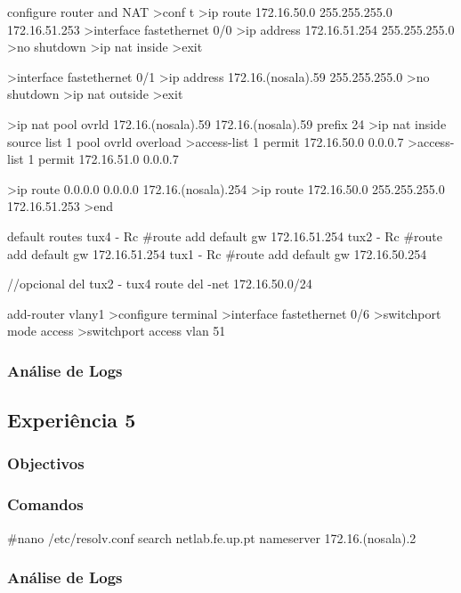 \documentclass[a4paper,11pt]{article}
\begin{document}
configure router and NAT
>conf t
>ip route 172.16.50.0 255.255.255.0 172.16.51.253 
>interface fastethernet 0/0 
>ip address 172.16.51.254 255.255.255.0 
>no shutdown 
>ip nat inside 
>exit 

>interface fastethernet 0/1 
>ip address 172.16.(nosala).59 255.255.255.0 
>no shutdown 
>ip nat outside 
>exit 

>ip nat pool ovrld 172.16.(nosala).59 172.16.(nosala).59 prefix 24
>ip nat inside source list 1 pool ovrld overload 
>access-list 1 permit 172.16.50.0 0.0.0.7 
>access-list 1 permit 172.16.51.0 0.0.0.7 

>ip route 0.0.0.0 0.0.0.0 172.16.(nosala).254 
>ip route 172.16.50.0 255.255.255.0 172.16.51.253 
>end

default routes
tux4 - Rc #route add default gw 172.16.51.254
tux2 - Rc #route add default gw 172.16.51.254
tux1 - Rc #route add default gw 172.16.50.254

//opcional
del tux2 - tux4
route del -net 172.16.50.0/24

add-router vlany1
>configure terminal
>interface fastethernet 0/6
>switchport mode access
>switchport access vlan 51

\subsubsection{Análise de Logs}

\subsection{Experiência 5}
\subsubsection{Objectivos}

\subsubsection{Comandos}

#nano /etc/resolv.conf
search netlab.fe.up.pt
nameserver 172.16.(nosala).2

\subsubsection{Análise de Logs}

\end{document}
